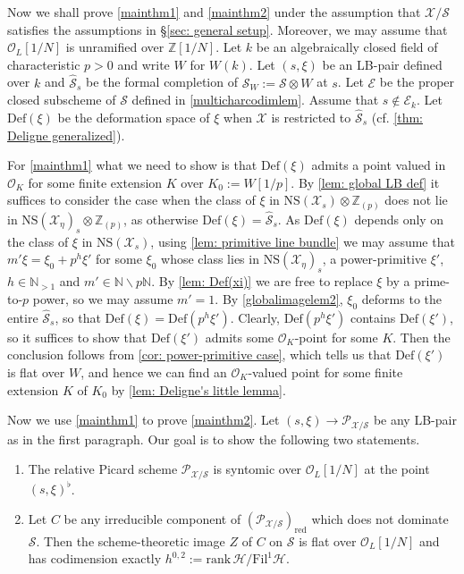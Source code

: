 \documentclass[letter, 11pt]{article}
\theoremstyle{plain}
\theoremstyle{definition}
\newcommand{\IN}{\mathbb{N}}
\newcommand{\IZ}{\mathbb{Z}}
\newcommand\tensor{{\otimes}}
\newcommand{\<}{\langle}
\renewcommand{\>}{\rangle}
\newcommand{\sH}{\mathcal{H}}
\newcommand{\sX}{\mathcal{X}}
\newcommand{\sS}{\mathcal{S}}
\newcommand{\sE}{\mathcal{E}}
\newcommand{\sO}{\mathcal{O}}
\newcommand{\Fil}{\mathrm{Fil}}
\newcommand{\shP}{\mathscr{P}}
\newcommand{\Def}{\mathrm{Def}}
\newcommand{\NS}{\mathrm{NS}}
\newcommand{\red}{\mathrm{red}}
\begin{document}
\subsubsection{} \label{sec: actual proof of main thms} Now we shall prove \ref{mainthm1} and \ref{mainthm2} under the assumption that $\sX/\sS$ satisfies the assumptions in \S\ref{sec: general setup}. Moreover, we may assume that $\sO_L[1/N]$ is unramified over $\IZ[1/N]$. Let $k$ be an algebraically closed field of characteristic $p > 0$ and write $W$ for $W(k)$. Let $(s, \xi)$ be an LB-pair defined over $k$ and $\hat{\sS}_s$ be the formal completion of $\sS_W := \sS \tensor W$ at $s$. Let $\sE$ be the proper closed subscheme of $\sS$ defined in \ref{multicharcodimlem}. Assume that $s \not\in \sE_k$. Let $\Def(\xi)$ be the deformation space of $\xi$ when $\sX$ is restricted to $\hat{\sS}_s$ (cf. \ref{thm: Deligne generalized}). 

For \ref{mainthm1} what we need to show is that $\Def(\xi)$ admits a point valued in $\sO_K$ for some finite extension $K$ over $K_0 := W[1/p]$. By \ref{lem: global LB def} it suffices to consider the case when the class of $\xi$ in $\NS(\sX_s) \tensor \IZ_{(p)}$ does not lie in $\NS(\sX_\eta)_s \tensor \IZ_{(p)}$, as otherwise $\Def(\xi) = \hat{\sS}_s$.  As $\Def(\xi)$ depends only on the class of $\xi$ in $\NS(\sX_s)$, using \ref{lem: primitive line bundle} we may assume that $m' \xi = \xi_0 + p^h \xi'$ for some $\xi_0$ whose class lies in $\NS(\sX_\eta)_s$, a power-primitive $\xi'$, $h \in \IN_{> 1}$ and $m' \in \IN \smallsetminus p\IN$. By \ref{lem: Def(xi)} we are free to replace $\xi$ by a prime-to-$p$ power, so we may assume $m' = 1$. By \ref{globalimagelem2}, $\xi_0$ deforms to the entire $\hat{\sS}_s$, so that $\Def(\xi) = \Def(p^h \xi')$. Clearly, $\Def(p^h \xi')$ contains $\Def(\xi')$, so it suffices to show that $\Def(\xi')$ admits some $\sO_K$-point for some $K$. Then the conclusion follows from \ref{cor: power-primitive case}, which tells us that $\Def(\xi')$ is flat over $W$, and hence we can find an $\sO_K$-valued point for some finite extension $K$ of $K_0$ by \ref{lem: Deligne's little lemma}. 

Now we use \ref{mainthm1} to prove \ref{mainthm2}. Let $(s, \xi) \to \shP_{\sX/\sS}$ be any LB-pair as in the first paragraph. Our goal is to show the following two statements. 
\begin{enumerate}[label = \upshape{(\alph*)}]
    \item The relative Picard scheme $\shP_{\sX/\sS}$ is syntomic over $\sO_L[1/N]$ at the point $(s, \xi)^\flat$. 
    \item Let $C$ be any irreducible component of $(\shP_{\sX/\sS})_\red$ which does not dominate $\sS$. Then the scheme-theoretic image $Z$ of $C$ on $\sS$ is flat over $\sO_L[1/N]$ and has codimension exactly $h^{0, 2} := \mathrm{rank\,} \sH/ \Fil^1 \sH$. 
\end{enumerate}
\end{document}
